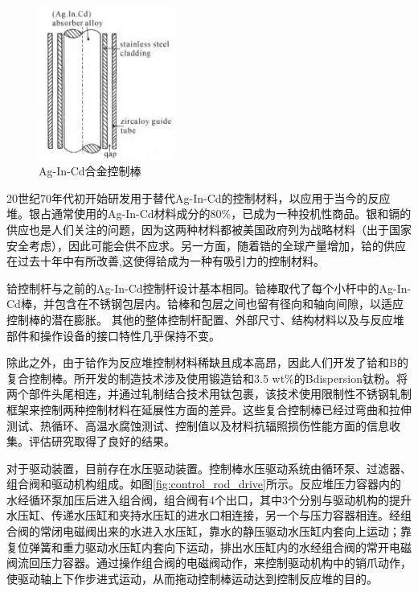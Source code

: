 \documentclass{article}
\begin{document}
\begin{figure}[htbp]
    \centering
    \includegraphics[width=0.4\textwidth]{figures/ChenHaoHeJiAgInCdHeJinBangCaiLiaoYanJiuJinZhan2019.png}
    \caption{Ag-In-Cd合金控制棒}
    \label{fig:control_rod}
\end{figure}

20世纪70年代初开始研发用于替代Ag-In-Cd的控制材料，以应用于当今的反应堆。银占通常使用的Ag-In-Cd材料成分的80\%，已成为一种投机性商品。银和镉的供应也是人们关注的问题，因为这两种材料都被美国政府列为战略材料（出于国家安全考虑），因此可能会供不应求。另一方面，随着锆的全球产量增加，铪的供应在过去十年中有所改善,这使得铪成为一种有吸引力的控制材料。

铪控制杆与之前的Ag-In-Cd控制杆设计基本相同。铪棒取代了每个小杆中的Ag-In-Cd棒，并包含在不锈钢包层内。铪棒和包层之间也留有径向和轴向间隙，以适应控制棒的潜在膨胀。\cite{kellerDevelopmentHafniumComparison1982}
其他的整体控制杆配置、外部尺寸、结构材料以及与反应堆部件和操作设备的接口特性几乎保持不变。

除此之外，由于铪作为反应堆控制材料稀缺且成本高昂，因此人们开发了铪和B的复合控制棒。所开发的制造技术涉及使用锻造铪和3.5 wt\%的Bdispersion钛粉。将两个部件头尾相连，并通过轧制结合技术用钛包裹，该技术使用限制性不锈钢轧制框架来控制两种控制材料在延展性方面的差异。这些复合控制棒已经过弯曲和拉伸测试、热循环、高温水腐蚀测试、控制值以及材料抗辐照损伤性能方面的信息收集。评估研究取得了良好的结果。\cite{cunninghamDevelopmentCompositeControl1958}

对于驱动装置，目前存在水压驱动装置。控制棒水压驱动系统由循环泵、过滤器、组合阀和驱动机构组成。如图\ref{fig:control_rod_drive}所示。反应堆压力容器内的水经循环泵加压后进入组合阀，组合阀有4个出口，其中3个分别与驱动机构的提升水压缸、传递水压缸和夹持水压缸的进水口相连接，另一个与压力容器相连。经组合阀的常闭电磁阀出来的水进入水压缸，靠水的静压驱动水压缸内套向上运动；靠复位弹簧和重力驱动水压缸内套向下运动，排出水压缸内的水经组合阀的常开电磁阀流回压力容器。通过操作组合阀的电磁阀动作，来控制驱动机构中的销爪动作，使驱动轴上下作步进式运动，从而拖动控制棒运动达到控制反应堆的目的。\cite{BoHanLiangHeFanYingDuiKongZhiBangShuiYaQuDongJiShu2005}
\end{document}
